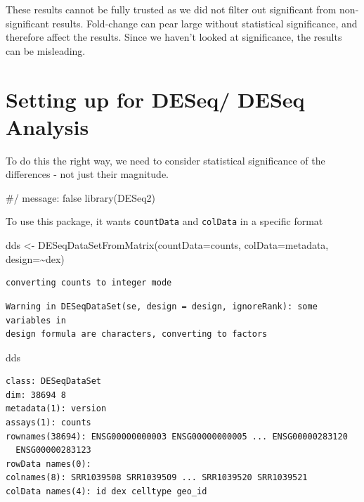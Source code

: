 \documentclass[
  letterpaper,
  DIV=11,
  numbers=noendperiod]{scrartcl}
\newenvironment{Shaded}{\begin{snugshade}}{\end{snugshade}}
\newcommand{\AttributeTok}[1]{\textcolor[rgb]{0.40,0.45,0.13}{#1}}
\newcommand{\CommentTok}[1]{\textcolor[rgb]{0.37,0.37,0.37}{#1}}
\newcommand{\FunctionTok}[1]{\textcolor[rgb]{0.28,0.35,0.67}{#1}}
\newcommand{\NormalTok}[1]{\textcolor[rgb]{0.00,0.23,0.31}{#1}}
\newcommand{\OtherTok}[1]{\textcolor[rgb]{0.00,0.23,0.31}{#1}}
\newcommand{\SpecialCharTok}[1]{\textcolor[rgb]{0.37,0.37,0.37}{#1}}
\begin{document}
These results cannot be fully trusted as we did not filter out
significant from non-significant results. Fold-change can pear large
without statistical significance, and therefore affect the results.
Since we haven't looked at significance, the results can be misleading.

\section{Setting up for DESeq/ DESeq
Analysis}\label{setting-up-for-deseq-deseq-analysis}

To do this the right way, we need to consider statistical significance
of the differences - not just their magnitude.

\begin{Shaded}
\begin{Highlighting}[]
\CommentTok{\#/ message: false}
\FunctionTok{library}\NormalTok{(DESeq2)}
\end{Highlighting}
\end{Shaded}

To use this package, it wants \texttt{countData} and \texttt{colData} in
a specific format

\begin{Shaded}
\begin{Highlighting}[]
\NormalTok{dds }\OtherTok{\textless{}{-}} \FunctionTok{DESeqDataSetFromMatrix}\NormalTok{(}\AttributeTok{countData=}\NormalTok{counts, }
                              \AttributeTok{colData=}\NormalTok{metadata, }
                              \AttributeTok{design=}\SpecialCharTok{\textasciitilde{}}\NormalTok{dex)}
\end{Highlighting}
\end{Shaded}

\begin{verbatim}
converting counts to integer mode
\end{verbatim}

\begin{verbatim}
Warning in DESeqDataSet(se, design = design, ignoreRank): some variables in
design formula are characters, converting to factors
\end{verbatim}

\begin{Shaded}
\begin{Highlighting}[]
\NormalTok{dds}
\end{Highlighting}
\end{Shaded}

\begin{verbatim}
class: DESeqDataSet 
dim: 38694 8 
metadata(1): version
assays(1): counts
rownames(38694): ENSG00000000003 ENSG00000000005 ... ENSG00000283120
  ENSG00000283123
rowData names(0):
colnames(8): SRR1039508 SRR1039509 ... SRR1039520 SRR1039521
colData names(4): id dex celltype geo_id
\end{verbatim}
\end{document}
